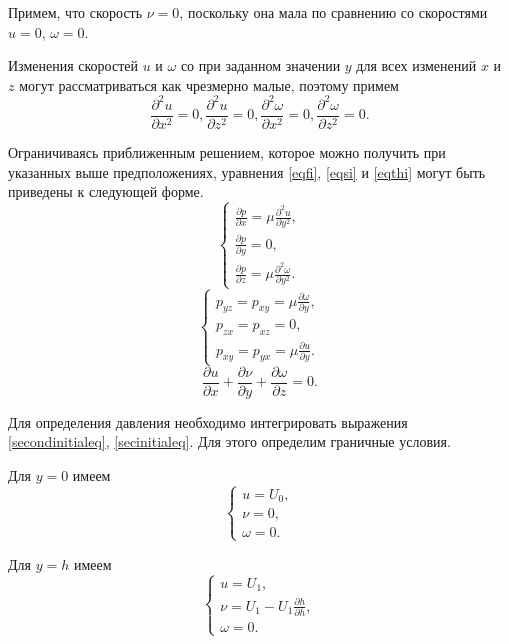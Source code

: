 \documentclass[a4paper,14pt]{extarticle}
\begin{document}
Примем, что скорость $\nu = 0$, поскольку она мала по сравнению со скоростями $u = 0$, $\omega = 0$.

Изменения скоростей $u$ и $\omega$ со при заданном значении $y$ для всех изменений $ x $ и $z$ могут рассматриваться как чрезмерно малые, поэтому примем
\[
\frac{\partial^2 u}{\partial x^2} = 0, 
\frac{\partial^2 u}{\partial z^2} = 0, 
\frac{\partial^2 \omega}{\partial x^2} = 0, 
\frac{\partial^2 \omega}{\partial z^2} = 0. 
\]

Ограничиваясь приближенным решением, которое можно
получить при указанных выше предположениях, уравнения \eqref{eqfi}, \eqref{eqsi} и \eqref{eqthi} могут быть приведены к следующей форме.
\begin{equation}
	\label{secondinitialeq}
	\begin{cases}
		\frac{\partial p }{\partial x} = \mu \frac{\partial^2 u}{\partial y^2}, \\
		\frac{\partial p }{\partial y} = 0, \\
		\frac{\partial p }{\partial z} = \mu \frac{\partial^2 \omega}{\partial y^2}.
	\end{cases}
\end{equation}
\begin{equation}
	\label{secinitialeq}
	\begin{cases}
		p_{yz} = p_{xy} = \mu \frac{\partial \omega}{\partial y}, \\
		p_{zx} = p_{xz} = 0, \\
		p_{xy} = p_{yx} = \mu \frac{\partial u}{\partial y}.
	\end{cases}
\end{equation}
\begin{equation*}
	\frac{\partial u}{\partial x} + \frac{\partial \nu}{\partial y} + \frac{\partial \omega}{\partial z} = 0.
\end{equation*}

Для определения давления необходимо интегрировать выражения \eqref{secondinitialeq}, \eqref{secinitialeq}. Для этого определим граничные условия.

\noindent Для $y = 0$ имеем
\[
\begin{cases}
u = U_0, \\
 \nu = 0, \\
  \omega = 0.
\end{cases}
\]

\noindent Для $y = h$ имеем
\[
\begin{cases}
u = U_1, \\ 
\nu = U_1 - U_1 \frac{\partial  h}{\partial h}, \\ \omega = 0.
\end{cases}
\]
\end{document}
